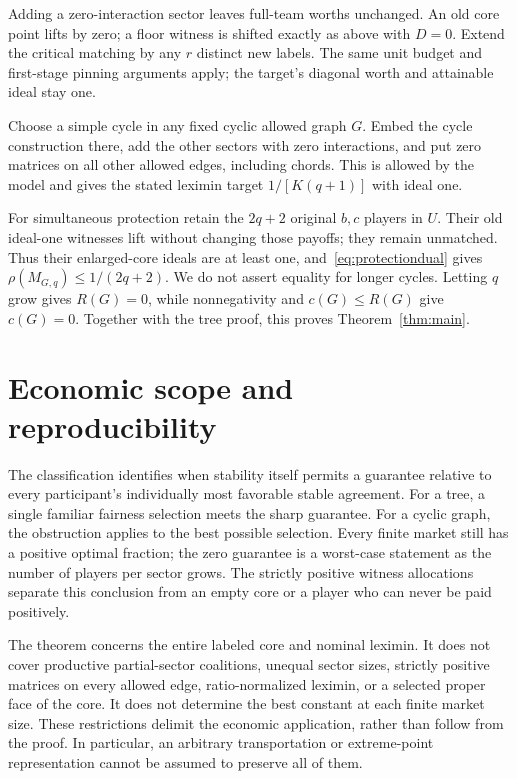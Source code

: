\documentclass[11pt]{article}
\theoremstyle{remark}\newtheorem{remark}[theorem]{Remark}
\begin{document}
Adding a zero-interaction sector leaves full-team worths unchanged.
An old core point lifts by zero; a floor witness is shifted exactly as
above with $D=0$. Extend the critical matching by any $r$ distinct new
labels. The same unit budget and first-stage pinning arguments apply;
the target's diagonal worth and attainable ideal stay one.

Choose a simple cycle in any fixed cyclic allowed graph $G$. Embed the
cycle construction there, add the other sectors with zero interactions,
and put zero matrices on all other allowed edges, including chords.
This is allowed by the model and gives the stated leximin target
$1/[K(q+1)]$ with ideal one.

For simultaneous protection retain the $2q+2$ original $b,c$ players in
$U$. Their old ideal-one witnesses lift without changing those payoffs;
they remain unmatched. Thus their enlarged-core ideals are at least one,
and~\eqref{eq:protectiondual} gives
$\rho(M_{G,q})\le1/(2q+2)$. We do not assert equality for longer cycles.
Letting $q$ grow gives $R(G)=0$, while nonnegativity and $c(G)\le R(G)$
give $c(G)=0$. Together with the tree proof, this proves
Theorem~\ref{thm:main}.

\section{Economic scope and reproducibility}
The classification identifies when stability itself permits a guarantee
relative to every participant's individually most favorable stable agreement.
For a tree, a single familiar fairness selection meets the sharp guarantee.
For a cyclic graph, the obstruction applies to the best possible selection.
Every finite market still has a positive optimal fraction; the zero guarantee
is a worst-case statement as the number of players per sector grows. The
strictly positive witness allocations separate this conclusion from an empty
core or a player who can never be paid positively.

The theorem concerns the entire labeled core and nominal leximin. It does not
cover productive partial-sector coalitions, unequal sector sizes, strictly
positive matrices on every allowed edge, ratio-normalized leximin, or a
selected proper face of the core. It does not determine the best constant at
each finite market size. These restrictions delimit the economic application,
rather than follow from the proof. In particular, an arbitrary transportation
or extreme-point representation cannot be assumed to preserve all of them.
\end{document}
